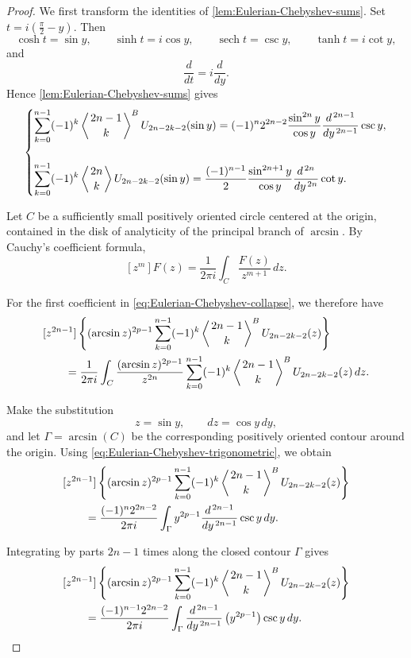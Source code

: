 \documentclass[10pt,a4paper]{amsart}
\begin{document}
\begin{proof}
We first transform the identities of
\cref{lem:Eulerian-Chebyshev-sums}.
Set \(\displaystyle
t=i\left(\frac{\pi}{2}-y\right).\)
Then
\[
\cosh t=\sin y,
\qquad
\sinh t=i\cos y,
\qquad
\operatorname{sech}t=\csc y,
\qquad
\tanh t=i\cot y,
\]
and
\[
\frac{d}{dt}=i\frac{d}{dy}.
\]
Hence \cref{lem:Eulerian-Chebyshev-sums} gives
\begin{equation}\label{eq:Eulerian-Chebyshev-trigonometric}
\begin{dcases}
\displaystyle
\sum_{k=0}^{n-1}
(-1)^k
\left\langle {2n-1\atop k}\right\rangle^{B}
U_{2n-2k-2}(\sin y)
=
(-1)^n2^{2n-2}
\frac{\sin^{2n}y}{\cos y}
\frac{d^{\,2n-1}}{dy^{\,2n-1}}\csc y,
\\[3ex]
\displaystyle
\sum_{k=0}^{n-1}
(-1)^k
\left\langle {2n\atop k}\right\rangle
U_{2n-2k-2}(\sin y)
=
\frac{(-1)^{n-1}}{2}
\frac{\sin^{2n+1}y}{\cos y}
\frac{d^{\,2n}}{dy^{\,2n}}\cot y.
\end{dcases}
\end{equation}

Let $C$ be a sufficiently small positively oriented circle
centered at the origin, contained in the disk of analyticity of
the principal branch of $\arcsin$. By Cauchy's coefficient formula,
\[
[z^m]F(z)
=
\frac{1}{2\pi i}
\int_C
\frac{F(z)}{z^{m+1}}\,dz.
\]

For the first coefficient in
\cref{eq:Eulerian-Chebyshev-collapse}, we therefore have
\begin{align*}
&[z^{2n-1}]\left\{
(\arcsin z)^{2p-1}
\sum_{k=0}^{n-1}
(-1)^k
\left\langle {2n-1\atop k}\right\rangle^{B}
U_{2n-2k-2}(z)\right\}
\\
&\qquad=
\frac{1}{2\pi i}
\int_C
\frac{(\arcsin z)^{2p-1}}{z^{2n}}
\sum_{k=0}^{n-1}
(-1)^k
\left\langle {2n-1\atop k}\right\rangle^{B}
U_{2n-2k-2}(z)\,dz.
\end{align*}

Make the substitution
\[
z=\sin y,
\qquad
dz=\cos y\,dy,
\]
and let $\Gamma=\arcsin(C)$ be the corresponding positively
oriented contour around the origin. Using
\cref{eq:Eulerian-Chebyshev-trigonometric}, we obtain
\begin{align*}
&[z^{2n-1}]\left\{
(\arcsin z)^{2p-1}
\sum_{k=0}^{n-1}
(-1)^k
\left\langle {2n-1\atop k}\right\rangle^{B}
U_{2n-2k-2}(z)\right\}
\\
&\qquad=
\frac{(-1)^n2^{2n-2}}{2\pi i}
\int_{\Gamma}
y^{2p-1}
\frac{d^{\,2n-1}}{dy^{\,2n-1}}\csc y\,dy.
\end{align*}

Integrating by parts $2n-1$ times along the closed contour
$\Gamma$ gives
\begin{align}
&[z^{2n-1}]\left\{
(\arcsin z)^{2p-1}
\sum_{k=0}^{n-1}
(-1)^k
\left\langle {2n-1\atop k}\right\rangle^{B}
U_{2n-2k-2}(z)\right\}
\nonumber\\
&\qquad=
\frac{(-1)^{n-1}2^{2n-2}}{2\pi i}
\int_{\Gamma}
\frac{d^{\,2n-1}}{dy^{\,2n-1}}
\left(y^{2p-1}\right)
\csc y\,dy.
\label{eq:collapse-B-Cauchy}
\end{align}


\end{proof}
\end{document}
